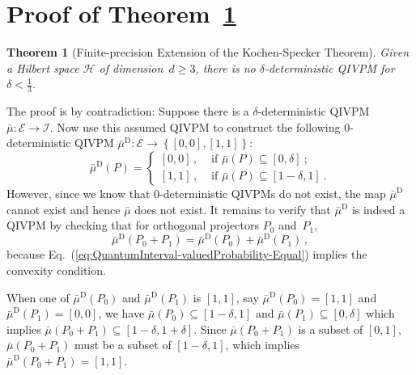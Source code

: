 \documentclass[english,reprint, aps, prl,superscriptaddress, showpacs,
showkeys, longbibliography, amsmath, amssymb, floatfix]{revtex4-1}
\theoremstyle{plain}
\newtheorem{thm}{Theorem}
\theoremstyle{definition}
\newcommand{\Hilb}{\mathcal{H}}
\newcommand{\events}{\ensuremath{\mathcal{E}}}
\newcommand{\imposs}{\ensuremath{\left[0,0\right]}}
\newcommand{\necess}{\ensuremath{\left[1,1\right]}}
\begin{document}


\appendix

\section{\label{sec:Proof-of-Theorem}Proof of Theorem~\ref{cor:Kochen-Specker-IVPM}}

\begin{thm}[Finite-precision Extension of the Kochen-Specker Theorem]
\label{cor:Kochen-Specker-IVPM} Given a Hilbert space $\Hilb$ of
dimension~$d\ge3$, there is no $\delta$-deterministic QIVPM for
$\delta<\frac{1}{3}$.\end{thm}

The proof is by contradiction: Suppose there is a $\delta$-deterministic
QIVPM~$\bar{\mu}:\events\rightarrow\mathscr{I}$. Now use this assumed
QIVPM to construct the following $0$-deterministic QIVPM $\bar{\mu}^{\textrm{D}}:\events\rightarrow\left\{ \imposs,\necess\right\} $:
\begin{equation}
\bar{\mu}^{\textrm{D}}\left(P\right)=\begin{cases}
\imposs\,, & \textrm{ if }\bar{\mu}\left(P\right)\subseteq\left[0,\delta\right]\:;\\
\necess\,, & \textrm{ if }\bar{\mu}\left(P\right)\subseteq\left[1-\delta,1\right]\:.
\end{cases}
\end{equation}
However, since we know that $0$-deterministic QIVPMs do not exist,
the map $\bar{\mu}^{\textrm{D}}$ cannot exist and hence $\bar{\mu}$
does not exist. It remains to verify that $\bar{\mu}^{\textrm{D}}$
is indeed a QIVPM by checking that for orthogonal projectors $P_{0}$
and~$P_{1}$, 
\begin{equation}
\bar{\mu}^{\textrm{D}}\left(P_{0}+P_{1}\right)=\bar{\mu}^{\textrm{D}}\left(P_{0}\right)+\bar{\mu}^{\textrm{D}}\left(P_{1}\right)\,,\label{eq:QuantumInterval-valuedProbability-Equal}
\end{equation}
because Eq.~(\ref{eq:QuantumInterval-valuedProbability-Equal}) implies
the convexity condition.

When one of $\bar{\mu}^{\textrm{D}}\left(P_{0}\right)$ and $\bar{\mu}^{\textrm{D}}\left(P_{1}\right)$
is $\necess$, say $\bar{\mu}^{\textrm{D}}\left(P_{0}\right)=\necess$
and $\bar{\mu}^{\textrm{D}}\left(P_{1}\right)=\imposs$, we have $\bar{\mu}\left(P_{0}\right)\subseteq\left[1-\delta,1\right]$
and $\bar{\mu}\left(P_{1}\right)\subseteq\left[0,\delta\right]$ which
implies $\bar{\mu}\left(P_{0}+P_{1}\right)\subseteq\left[1-\delta,1+\delta\right]$.
Since $\bar{\mu}\left(P_{0}+P_{1}\right)$ is a subset of $\left[0,1\right]$,
$\bar{\mu}\left(P_{0}+P_{1}\right)$ must be a subset of $\left[1-\delta,1\right]$,
which implies $\bar{\mu}^{\textrm{D}}\left(P_{0}+P_{1}\right)=\necess$.
\end{document}
